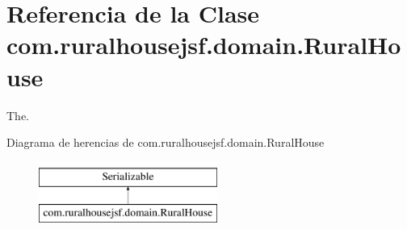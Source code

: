 \hypertarget{classcom_1_1ruralhousejsf_1_1domain_1_1_rural_house}{}\section{Referencia de la Clase com.\+ruralhousejsf.\+domain.\+Rural\+House}
\label{classcom_1_1ruralhousejsf_1_1domain_1_1_rural_house}


The.  


Diagrama de herencias de com.\+ruralhousejsf.\+domain.\+Rural\+House\begin{figure}[H]
\begin{center}
\leavevmode
\includegraphics[height=2.000000cm]{dd/d77/classcom_1_1ruralhousejsf_1_1domain_1_1_rural_house}
\end{center}
\end{figure}
